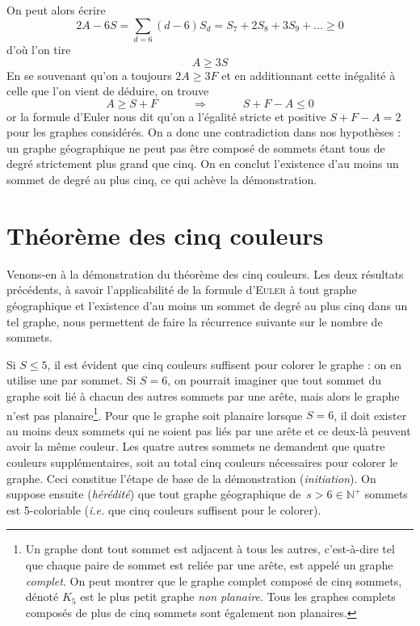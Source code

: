 On peut alors écrire $$2A-6S=\sum\limits_{d=6}(d-6)S_d=S_7+2S_8+3S_9+...\geqslant 0$$ d'où l'on tire $$A\geqslant 3S$$ En se souvenant qu'on a toujours $2A\geqslant 3F$ et en additionnant cette inégalité à celle que l'on vient de déduire, on trouve $$A\geqslant S+F\quad\qquad\Rightarrow\quad\qquad S+F-A\leqslant 0$$ or la formule d'Euler nous dit qu'on a l'égalité stricte et positive $S+F-A=2$ pour les graphes considérés. On a donc une contradiction dans nos hypothèses : un graphe géographique ne peut pas être composé de sommets étant tous de degré strictement plus grand que cinq. On en conclut l'existence d'au moins un sommet de degré au plus cinq, ce qui achève la démonstration.\\

\section{Théorème des cinq couleurs}

Venons-en à la démonstration du théorème des cinq couleurs. Les deux résultats précédents, à savoir l'applicabilité de la formule d'\textsc{Euler} à tout graphe géographique et l'existence d'au moins un sommet de degré au plus cinq dans un tel graphe, nous permettent de faire la récurrence suivante sur le nombre de sommets.

Si $S\leqslant 5$, il est évident que cinq couleurs suffisent pour colorer le graphe : on en utilise une par sommet. Si $S=6$, on pourrait imaginer que tout sommet du graphe soit lié à chacun des autres sommets par une arête, mais alors le graphe n'est pas planaire\footnote{Un graphe dont tout sommet est adjacent à tous les autres, c'est-à-dire tel que chaque paire de sommet est reliée par une arête, est appelé un graphe \textit{complet}. On peut montrer que le graphe complet composé de cinq sommets, dénoté $K_5$ est le plus petit graphe \textit{non planaire}. Tous les graphes complets composés de plus de cinq sommets sont également non planaires.}. Pour que le graphe soit planaire lorsque $S=6$, il doit exister au moins deux sommets qui ne soient pas liés par une arête et ce deux-là peuvent avoir la même couleur. Les quatre autres sommets ne demandent que quatre couleurs supplémentaires, soit au total cinq couleurs nécessaires pour colorer le graphe. Ceci constitue l'étape de base de la démonstration (\textit{initiation}). On suppose ensuite (\textit{hérédité}) que tout graphe géographique de~$s>6\in\mathbb{N}^+$ sommets est 5-coloriable (\textit{i.e.} que cinq couleurs suffisent pour le colorer).

